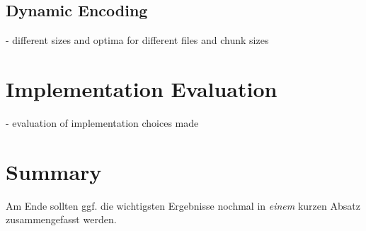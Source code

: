 \subsection{Dynamic Encoding}
- different sizes and optima for different files and chunk sizes \\


\section{Implementation Evaluation}
\label{ch:Conceptual Design:sec:Implementation Evaluation}
- evaluation of implementation choices made


\section{Summary}
\label{ch:Conceptual Design:sec:Summary}

Am Ende sollten ggf. die wichtigsten Ergebnisse nochmal in \emph{einem}
kurzen Absatz zusammengefasst werden.

